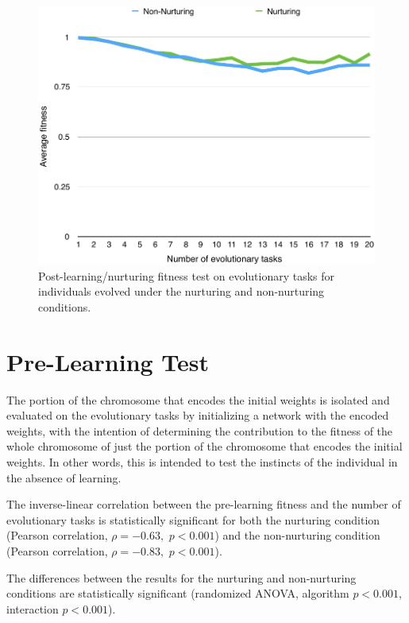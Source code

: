\documentclass[master]{outhesis}
\begin{document}
\begin{figure}[H]
	\centering
	\includegraphics{NurturingFitnessTestPlot.pdf}
	\caption{Post-learning/nurturing fitness test on evolutionary tasks for individuals evolved under the nurturing and non-nurturing conditions.}
\end{figure}

\section{Pre-Learning Test}

The portion of the chromosome that encodes the initial weights is isolated and evaluated on the evolutionary tasks by initializing a network with the encoded weights, with the intention of determining the contribution to the fitness of the whole chromosome of just the portion of the chromosome that encodes the initial weights.
In other words, this is intended to test the instincts of the individual in the absence of learning.

The inverse-linear correlation between the pre-learning fitness and the number of evolutionary tasks is statistically significant for both 
the nurturing condition (Pearson correlation, $\rho=-0.63,$ $p < 0.001$)
and the non-nurturing condition (Pearson correlation, $\rho=-0.83,$ $p < 0.001$).

The differences between the results for the nurturing and non-nurturing conditions are statistically significant (randomized ANOVA, algorithm $p < 0.001$, interaction $p < 0.001$).
\end{document}
